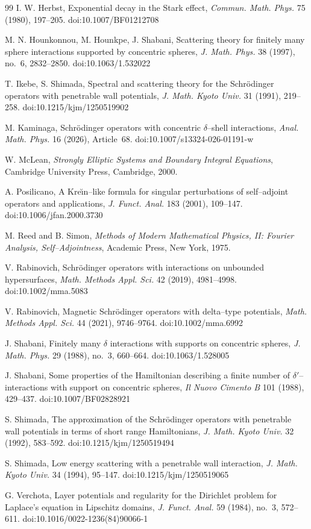 \documentclass[a4paper,11pt]{article}
\numberwithin{equation}{section}
\theoremstyle{remark}
\theoremstyle{definition}
\theoremstyle{remark}
\begin{document}
\begin{thebibliography}{99}
I. W. Herbst,
Exponential decay in the Stark effect,
\textit{Commun. Math. Phys.} 75 (1980), 197--205.
doi:10.1007/BF01212708

M. N. Hounkonnou, M. Hounkpe, J. Shabani,
Scattering theory for finitely many sphere interactions supported by
concentric spheres,
\textit{J. Math. Phys.} 38 (1997), no.~6, 2832--2850.
doi:10.1063/1.532022

T. Ikebe, S. Shimada,
Spectral and scattering theory for the Schr\"odinger operators with
penetrable wall potentials,
\textit{J. Math. Kyoto Univ.} 31 (1991), 219--258.
doi:10.1215/kjm/1250519902

M. Kaminaga,
Schr\"odinger operators with concentric $\delta$--shell interactions,
\textit{Anal. Math. Phys.} 16 (2026), Article~68.
doi:10.1007/s13324-026-01191-w

W. McLean,
\textit{Strongly Elliptic Systems and Boundary Integral Equations},
Cambridge University Press, Cambridge, 2000.

A. Posilicano,
A Kre\u{\i}n--like formula for singular perturbations of self--adjoint
operators and applications,
\textit{J. Funct. Anal.} 183 (2001), 109--147.
doi:10.1006/jfan.2000.3730

M. Reed and B. Simon,
\textit{Methods of Modern Mathematical Physics, II: Fourier Analysis,
Self--Adjointness},
Academic Press, New York, 1975.

V. Rabinovich,
Schr\"odinger operators with interactions on unbounded hypersurfaces,
\textit{Math. Methods Appl. Sci.} 42 (2019), 4981--4998.
doi:10.1002/mma.5083

V. Rabinovich,
Magnetic Schr\"odinger operators with delta--type potentials,
\textit{Math. Methods Appl. Sci.} 44 (2021), 9746--9764.
doi:10.1002/mma.6992

J. Shabani,
Finitely many $\delta$ interactions with supports on concentric spheres,
\textit{J. Math. Phys.} 29 (1988), no.~3, 660--664.
doi:10.1063/1.528005

J. Shabani,
Some properties of the Hamiltonian describing a finite number of
$\delta'$--interactions with support on concentric spheres,
\textit{Il Nuovo Cimento B} 101 (1988), 429--437.
doi:10.1007/BF02828921

S. Shimada,
The approximation of the Schr\"odinger operators with penetrable wall
potentials in terms of short range Hamiltonians,
\textit{J. Math. Kyoto Univ.} 32 (1992), 583--592.
doi:10.1215/kjm/1250519494

S. Shimada,
Low energy scattering with a penetrable wall interaction,
\textit{J. Math. Kyoto Univ.} 34 (1994), 95--147.
doi:10.1215/kjm/1250519065

G. Verchota,
Layer potentials and regularity for the Dirichlet problem for Laplace's
equation in Lipschitz domains,
\textit{J. Funct. Anal.} 59 (1984), no.~3, 572--611.
doi:10.1016/0022-1236(84)90066-1

\end{thebibliography}
\end{document}
